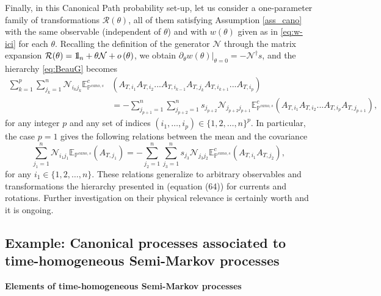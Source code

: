 \documentclass[a4paper,11pt]{article}
\numberwithin{equation}{section}
\newcommand{\bbbone}{\mathchoice {\rm 1\mskip-4mu l} {\rm 1\mskip-4mu l}
{\rm 1\mskip-4.5mu l} {\rm 1\mskip-5mu l}}
\begin{document}
Finally, in this Canonical Path probability set-up, let us consider a one-parameter family of transformations $\mathcal{R}(\theta)$, all of them satisfying Assumption \ref{ass_cano} with the same observable (independent of $\theta$) and with $w(\theta)$ given as in \eqref{eq:w-ici} for each $\theta$. Recalling the definition of the generator $\mathcal{N}$ through the matrix expansion $\mathcal{R}(\theta)=\bbbone_n +\theta\mathcal{N}+o\left(\theta\right)$, we obtain $\partial_{\theta}w(\theta)|_{\theta=0}=-\mathcal{N}^{\dagger}s$,
and the hierarchy \eqref{eq:BeauG} becomes 
\begin{align}
\label{eq:SuperG}
\sum_{k=1}^{p}\sum_{j_{k}=1}^{n}\mathcal{N}_{i_{k}j_{k}}\mathbb{E}_{\mathbb{P}^{cano,s}}^{c}&\left(A_{T,i_{1}}A_{T,i_{2}}...A_{T,i_{k-1}}A_{T,j_{k}}A_{T,i_{k+1}}...A_{T,i_{p}}\right) \nonumber\\
&= -\sum_{j_{p+1}=1}^{n}\sum_{j_{p+2}=1}^{n}s_{j_{p+2}} \mathcal{N}_{j_{p+2}j_{p+1}}\mathbb{E}_{\mathbb{P}^{cano,s}}^{c}\left(A_{T,i_{1}}A_{T,i_{2}}...A_{T,i_{p}}A_{T,j_{p+1}}\right) ,
\end{align}
for any integer $p$ and any set of indices $(i_1,\ldots, i_p) \in \{1,2,\ldots,n \}^p$.
In particular, the case $p=1$ gives the following relations between the mean and the covariance
\begin{equation}
\label{eq:Super1}
\sum_{j_{1}=1}^{n}\mathcal{N}_{i_{1}j_{1}}\mathbb{E}_{\mathbb{P}^{cano,s}}\left(A_{T,j_{1}}\right)=-\sum_{j_{2}=1}^{n}\sum_{j_{3}=1}^{n}s_{j_{3}}\mathcal{N}_{j_{3}j_{2}}\mathbb{E}_{\mathbb{P}^{cano,s}}^{c}\left(A_{T,i_{1}}A_{T,j_{2}}\right),
\end{equation}
for any $i_1 \in \{1,2,\ldots,n \}$. These relations generalize to arbitrary observables and transformations the hierarchy presented in \cite{Hur+14} (equation (64)) for currents and rotations. Further investigation on their physical relevance is certainly worth and it is ongoing.





\subsection{Example: Canonical processes associated to time-homogeneous Semi-Markov processes}
\label{sec:ex1}


\textbf{Elements of time-homogeneous Semi-Markov processes}
\end{document}
